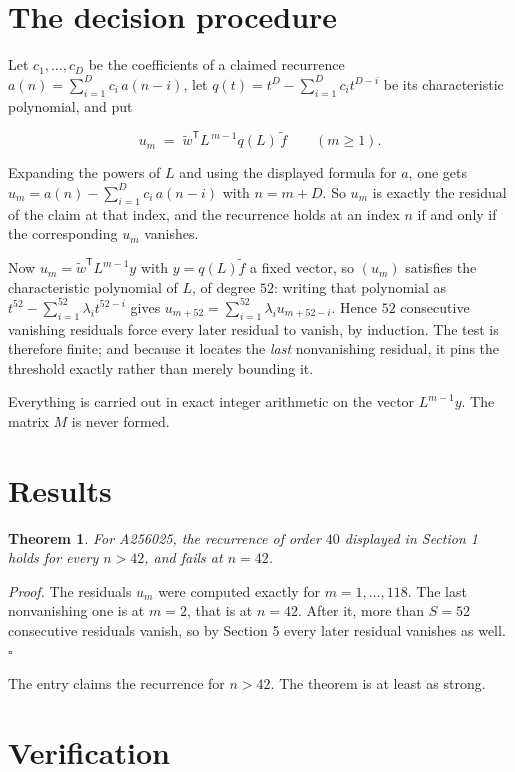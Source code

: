 \documentclass[11pt]{article}
\newtheorem{theorem}{Theorem}
\theoremstyle{definition}
\begin{document}
\section{The decision procedure}

Let $c_1,\dots,c_D$ be the coefficients of a claimed recurrence $a(n) = \sum_{i=1}^{D} c_i\,a(n-i)$, let $q(t) = t^{D} - \sum_{i=1}^{D} c_i t^{D-i}$ be its characteristic polynomial, and put

\[u_m \;=\; \tilde w^{\mathsf T} L^{\,m-1} q(L)\,\tilde f \qquad (m \ge 1).\]

Expanding the powers of $L$ and using the displayed formula for $a$, one gets $u_m = a(n) - \sum_{i=1}^{D} c_i\,a(n-i)$ with $n = m + D$. So $u_m$ is exactly the residual of the claim at that index, and the recurrence holds at an index $n$ if and only if the corresponding $u_m$ vanishes.

Now $u_m = \tilde w^{\mathsf T} L^{m-1} y$ with $y = q(L)\tilde f$ a fixed vector, so $(u_m)$ satisfies the characteristic polynomial of $L$, of degree $52$: writing that polynomial as $t^{52} - \sum_{i=1}^{52} \lambda_i t^{52-i}$ gives $u_{m+52} = \sum_{i=1}^{52} \lambda_i u_{m+52-i}$. Hence $52$ consecutive vanishing residuals force every later residual to vanish, by induction. The test is therefore finite; and because it locates the {\itshape last} nonvanishing residual, it pins the threshold exactly rather than merely bounding it.

Everything is carried out in exact integer arithmetic on the vector $L^{m-1}y$. The matrix $M$ is never formed.

\section{Results}

\begin{theorem} For A256025, the recurrence of order $40$ displayed in Section 1 holds for every $n > 42$, and fails at $n = 42$.\end{theorem}

{\itshape Proof.} The residuals $u_m$ were computed exactly for $m = 1,\dots,118$. The last nonvanishing one is at $m = 2$, that is at $n = 42$. After it, more than $S = 52$ consecutive residuals vanish, so by Section 5 every later residual vanishes as well. $\square$

The entry claims the recurrence for $n > 42$. The theorem is at least as strong.

\section{Verification}
\end{document}
